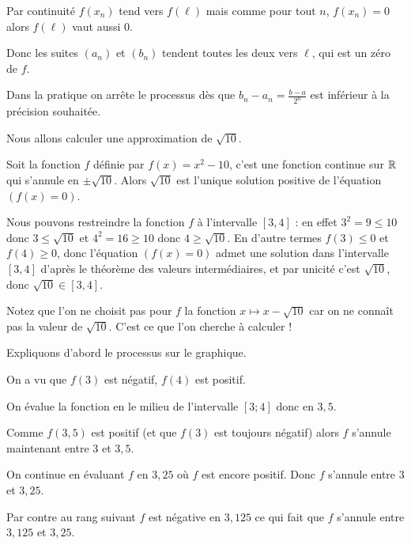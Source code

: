 \change

Par continuité $f(x_n)$ tend vers $f(\ell)$
mais comme pour tout $n$, $f(x_n)=0$ alors $f(\ell)$ vaut aussi $0$.

\change

Donc les suites $(a_n)$ et $(b_n)$ tendent toutes les deux vers $\ell$, 
qui est un zéro de $f$.

\change

Dans la pratique on arrête le processus dès que $b_n-a_n=\frac{b-a}{2^n}$ 
est inférieur à la précision souhaitée.

\diapo

Nous allons calculer une approximation de $\sqrt{10}$.


\change

Soit la fonction $f$ définie par $f(x)=x^2 - 10$, c'est une fonction continue sur $\mathbb{R}$
qui s'annule en $\pm\sqrt{10}$. Alors $\sqrt{10}$ est l'unique solution positive de l'équation $(f(x)=0)$.


\change

Nous pouvons restreindre la fonction $f$ à l'intervalle $[3,4]$ : en effet $3^2=9\le 10$ donc 
$3 \le \sqrt{10}$ et $4^2 = 16 \ge 10$ donc $4 \ge \sqrt{10}$. 
En d'autre termes $f(3) \le 0$ et $f(4) \ge 0$, donc l'équation $(f(x)=0)$ 
admet une solution dans l'intervalle $[3,4]$ 
d'après le théorème des valeurs intermédiaires, 
et par unicité c'est $\sqrt{10}$, donc $\sqrt{10} \in [3,4]$.

Notez que l'on ne choisit pas pour $f$ la fonction $x\mapsto x-\sqrt{10}$ 
car on ne connaît pas la valeur de $\sqrt{10}$. C'est ce que l'on cherche à calculer !




\diapo


Expliquons d'abord le processus sur le graphique.

On a vu que $f(3)$ est négatif, $f(4)$ est positif.

On évalue la fonction en le milieu de l'intervalle $[3;4]$ donc en $3,5$.

Comme $f(3,5)$ est positif (et que $f(3)$ est toujours négatif) alors
$f$ s'annule maintenant entre $3$ et $3,5$.


On continue en évaluant $f$ en $3,25$ où $f$ est encore positif. Donc
$f$ s'annule entre $3$ et $3,25$.

Par contre au rang suivant $f$ est négative en $3,125$ ce qui fait que 
$f$ s'annule entre $3,125$ et $3,25$.




